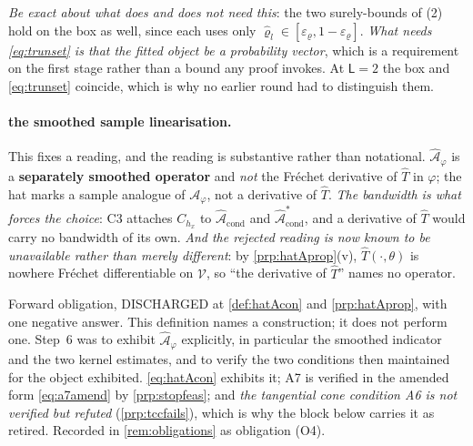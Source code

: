 \emph{Be exact about what does and does not need this}: the two surely-bounds of
\textup{(2)} hold on the box as well, since each uses only
$\hat\varrho_l\in[\varepsilon_\varrho,1-\varepsilon_\varrho]$. \emph{What needs \eqref{eq:trunset} is
that the fitted object be a probability vector}, which is a requirement on the first stage rather than a
bound any proof invokes. At $\mathsf L=2$ the box and
\eqref{eq:trunset} coincide, which is why no earlier round had to distinguish them.

\paragraph{the smoothed sample linearisation.}

This fixes a reading, and the reading is substantive rather than notational.
$\hat{\mathcal A}_\varphi$ is a \textbf{separately smoothed operator} and \emph{not} the Fr\'echet
derivative of $\hat T$ in $\varphi$; the hat marks a sample analogue of $\mathcal A_\varphi$, not a
derivative of $\hat T$. \emph{The bandwidth is what forces the choice}: C3 attaches
$C_{h_x}$ to $\hat{\mathcal A}_{\mathrm{cond}}$ and $\hat{\mathcal A}^\ast_{\mathrm{cond}}$, and a
derivative of $\hat T$ would carry no bandwidth of its own. \emph{And the rejected reading is now known
to be unavailable rather than merely different}: by \cref{prp:hatAprop}(v), $\hat T(\cdot,\theta)$ is
nowhere Fr\'echet differentiable on $\mathcal V$, so ``the derivative of $\hat T$'' names no operator.

Forward obligation, DISCHARGED at \cref{def:hatAcon} and \cref{prp:hatAprop}, with one negative
answer. This definition names a construction; it does not perform one. Step~6 was to exhibit
$\hat{\mathcal A}_\varphi$ explicitly, in particular the smoothed indicator and the two kernel
estimates, and to verify the two conditions then maintained for the object exhibited.
\eqref{eq:hatAcon} exhibits it; A7 is verified in the amended form
\eqref{eq:a7amend} by \cref{prp:stopfeas}; and \emph{the tangential cone condition A6 is not verified
but refuted} (\cref{prp:tccfails}), which is why the block below carries it as retired.
Recorded in \cref{rem:obligations} as obligation (O4).

